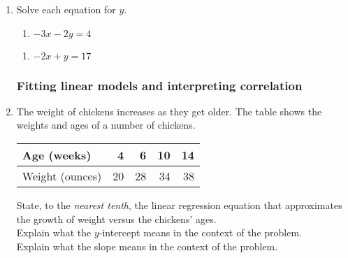 \documentclass[12pt, oneside]{article}
\begin{document}
\begin{enumerate}
  \item Solve each equation for $y$.
  \begin{multicols}{2}
    \raggedcolumns
    \begin{enumerate}
      \item $-3x-2y=4$\\[0.5cm]
    \end{enumerate}
    \begin{enumerate}
      \item $-2x+y=17$ \\[0.5cm]
    \end{enumerate}
  \end{multicols}

  \newpage


\subsubsection*{Fitting linear models and interpreting correlation}
\item The weight of chickens increases as they get older. The table shows the weights and ages of a number of chickens.
  \renewcommand{\arraystretch}{1.6}
    \begin{center}
      \begin{tabular}{|l|r|r|r|r|}
      \hline
      Age (weeks) & 4 & 6 & 10 & 14 \\
      \hline
      Weight (ounces)  & 20 & 28 & 34 & 38 \\
      \hline
      \end{tabular}
    \end{center}

    \begin{center} %
    \end{center}

    State, to the \emph{nearest tenth}, the linear regression equation that approximates the growth of weight versus the chickens' ages.\\[2cm]
    Explain what the $y$-intercept means in the context of the problem. \\[3cm]
    Explain what the slope means in the context of the problem.


\end{enumerate}
\end{document}
